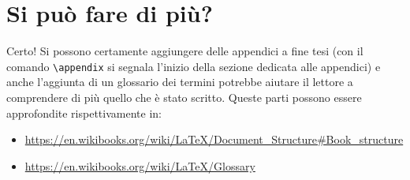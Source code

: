 \section{Si può fare di più?}

Certo! Si possono certamente aggiungere delle appendici a fine tesi (con il
comando \verb!\appendix! si segnala l'inizio della sezione dedicata alle
appendici) e anche l'aggiunta di un glossario dei termini potrebbe aiutare il
lettore a comprendere di più quello che è stato scritto.
Queste parti possono essere approfondite rispettivamente in:
\begin{itemize}
 \item
\url{https://en.wikibooks.org/wiki/LaTeX/Document_Structure#Book_structure}
 \item \url{https://en.wikibooks.org/wiki/LaTeX/Glossary}
\end{itemize}

